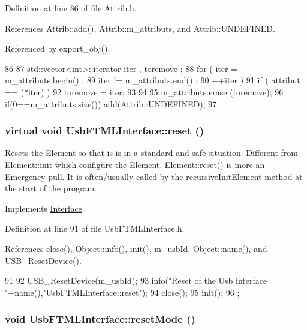 Definition at line 86 of file Attrib.h.

References Attrib::add(), Attrib::m\_\-attributs, and Attrib::UNDEFINED.

Referenced by export\_\-obj().


\begin{DoxyCode}
86                                {
87     std::vector<int>::iterator iter , toremove ;
88     for ( iter  = m_attributs.begin() ;
89           iter != m_attributs.end()   ;
90           ++iter ) {
91       if ( attribut == (*iter) ) {
92         toremove = iter;
93       }
94     }
95     m_attributs.erase (toremove);
96     if(0==m_attributs.size()) add(Attrib::UNDEFINED);
97   }
\end{DoxyCode}
\hypertarget{classUsbFTMLInterface_a1e53e5a0453e9aa731d1ec07aacbc8ab}{
\subsubsection[{reset}]{\setlength{\rightskip}{0pt plus 5cm}virtual void UsbFTMLInterface::reset ()}}
\label{classUsbFTMLInterface_a1e53e5a0453e9aa731d1ec07aacbc8ab}
Resets the \hyperlink{classElement}{Element} so that is is in a standard and safe situation. Different from \hyperlink{classElement_af42754b5cabc198869222725218d695c}{Element::init} which configure the \hyperlink{classElement}{Element}. \hyperlink{classElement_a69efffa22f06909d768149715565cb56}{Element::reset()} is more an Emergency pull. It is often/usually called by the recursiveInitElement method at the start of the program. 

Implements \hyperlink{classInterface_a4d44329cea9981a9e0392eaaf99efadd}{Interface}.

Definition at line 91 of file UsbFTMLInterface.h.

References close(), Object::info(), init(), m\_\-usbId, Object::name(), and USB\_\-ResetDevice().


\begin{DoxyCode}
91                        {
92     USB_ResetDevice(m_usbId);
93     info("Reset of the Usb interface "+name(),"UsbFTMLInterface::reset");
94     close();
95     init();
96   };
\end{DoxyCode}
\hypertarget{classUsbFTMLInterface_a91063d4374b617177c6b7a4022385dd1}{
\subsubsection[{resetMode}]{\setlength{\rightskip}{0pt plus 5cm}void UsbFTMLInterface::resetMode ()}}
\label{classUsbFTMLInterface_a91063d4374b617177c6b7a4022385dd1}


